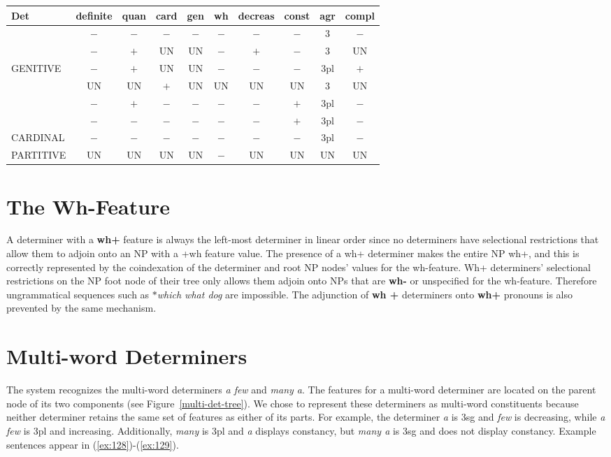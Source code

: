 \begin{table}[htb] 
\centering 
\begin{tabular}{|l||c|c|c|c|c|c|c|c|c|} 
\hline\hline 
Det&definite&quan&card&gen&wh&decreas&const&agr&compl\\ 
\hline 
\hline 
&$-$&$-$&$-$&$-$&$-$&$-$&$-$&3&$-$\\ 
&$-$&$+$&UN&UN&$-$&$+$&$-$&3&UN\\ 
GENITIVE&$-$&$+$&UN&UN&$-$&$-$&$-$&3pl&$+$\\ 
&UN&UN&$+$&UN&UN&UN&UN&3&UN\\ 
&$-$&$+$&$-$&$-$&$-$&$-$&$+$&3pl&$-$\\ 
&$-$&$-$&$-$&$-$&$-$&$-$&$+$&3pl&$-$\\ 
\hline 
CARDINAL&$-$&$-$&$-$&$-$&$-$&$-$&$-$&3pl\footnotemark&$-$\\ 
\hline 
PARTITIVE&UN&UN&UN&UN&$-$&UN&UN&UN&UN\\ 
\hline 
\end{tabular} 
\begin{rawhtml} <dl> <dt>{Selectional Restrictions Imposed by Groups of Determiners/Determiner Constructions <p> </dl> \end{rawhtml}
\label{det-ordering2} 
\end{table} 
 
 
\normalsize 
 
 
\section{The Wh-Feature} 
\label{agr-section} 
A determiner with a {\bf wh+} feature is always the left-most 
determiner in linear order since no determiners have selectional 
restrictions that allow them to adjoin onto an NP with a +wh feature 
value.  The presence of a wh+ determiner makes the entire NP wh+, and 
this is correctly represented by the coindexation of the determiner 
and root NP nodes' values for the wh-feature. Wh+ determiners' 
selectional restrictions on the NP foot node of their tree only allows them 
adjoin onto NPs that are {\bf wh-} or unspecified for the 
wh-feature. Therefore ungrammatical sequences such as {\it $\ast$which what dog} are impossible.  The adjunction of {\bf wh +} determiners onto 
{\bf wh+} pronouns is also prevented by the same mechanism. 
 
\section{Multi-word Determiners} 
The system recognizes the multi-word determiners {\it a few} and {\it many a}. 
The features for a multi-word determiner are located on the parent node of its 
two components (see Figure~\ref{multi-det-tree}).  We chose to represent these 
determiners as multi-word constituents because neither determiner retains the 
same set of features as either of its parts.  For example, the determiner 
{\it a} is 3sg and {\it few} is decreasing, while {\it a few} is 3pl and 
increasing.  Additionally, {\it many} is 3pl and {\it a} displays constancy, 
but {\it many a} is 3sg and does not display constancy.  Example sentences 
appear in (\ref{ex:128})-(\ref{ex:129}). 
 
